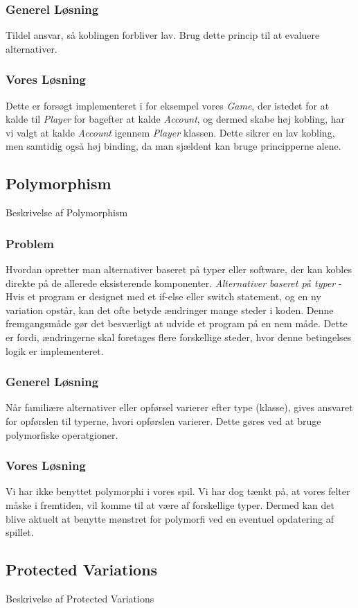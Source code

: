 \subsubsection*{Generel Løsning}
Tildel ansvar, så koblingen forbliver lav. Brug dette princip til at evaluere alternativer.
\subsubsection*{Vores Løsning}
Dette er forsøgt implementeret i for eksempel vores \textit{Game}, der istedet for at kalde til  \textit{Player} for bagefter at kalde \textit{Account}, og dermed skabe høj kobling, har vi valgt at kalde \textit{Account} igennem \textit{Player} klassen. Dette sikrer en lav kobling, men samtidig også høj binding, da man sjældent kan bruge principperne alene.
\subsection{Polymorphism}
Beskrivelse af Polymorphism
\subsubsection*{Problem}
Hvordan opretter man alternativer baseret på typer eller software, der kan kobles direkte på de allerede eksisterende komponenter.
\textit{Alternativer baseret på typer} - Hvis et program er designet med et if-else eller switch statement, og en ny variation opstår, kan det ofte betyde ændringer mange steder i koden. Denne fremgangsmåde gør det besværligt at udvide et program på en nem måde. Dette er fordi, ændringerne skal foretages flere forskellige steder, hvor denne betingelses logik er implementeret.
\subsubsection*{Generel Løsning}
Når familiære alternativer eller opførsel varierer efter type (klasse), gives ansvaret for opførslen til typerne, hvori opførslen varierer. Dette gøres ved at bruge polymorfiske operatgioner.
\subsubsection*{Vores Løsning}
Vi har ikke benyttet polymorphi i vores spil. Vi har dog tænkt på, at vores felter måske i fremtiden, vil komme til at være af forskellige typer. Dermed kan det blive aktuelt at benytte mønstret for polymorfi ved en eventuel opdatering af spillet.
\subsection{Protected Variations}
Beskrivelse af Protected Variations
